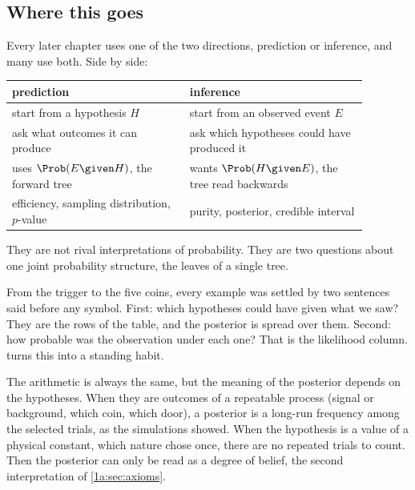 \subsection{Where this goes}

Every later chapter uses one of the two directions, prediction or inference,
and many use both. Side by side:
\begin{center}
\small
\begin{tabular}{@{}p{0.44\linewidth}p{0.44\linewidth}@{}}
\toprule
prediction & inference\\
\midrule
start from a hypothesis $H$ & start from an observed event $E$\\
ask what outcomes it can produce & ask which hypotheses could have produced it\\
uses $\Prob(E\given H)$, the forward tree & wants $\Prob(H\given E)$, the tree read backwards\\
efficiency, sampling distribution, $p$-value & purity, posterior, credible interval\\
\bottomrule
\end{tabular}
\end{center}
They are not rival interpretations of probability. They are two questions
about one joint probability structure, the leaves of a single tree.

From the trigger to the five coins, every example was settled by two sentences
said before any symbol. First: which hypotheses could have given what we saw?
They are the rows of the table, and the posterior is spread over them. Second:
how probable was the observation under each one? That is the likelihood
column.  turns this into a standing habit.

The arithmetic is always the same, but the meaning of the posterior depends on
the hypotheses. When they are outcomes of a repeatable process (signal or
background, which coin, which door), a posterior is a long-run frequency among
the selected trials, as the simulations showed. When the hypothesis is a value
of a physical constant, which nature chose once, there are no repeated trials
to count. Then the posterior can only be read as a degree of belief, the second
interpretation of \cref{1a:sec:axioms}.

